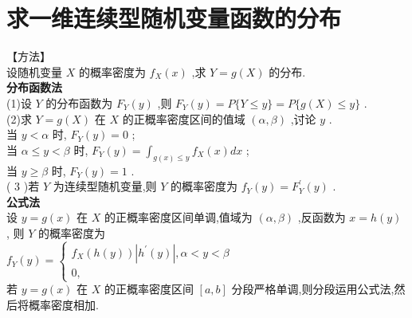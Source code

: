 \documentclass[12pt, a4paper, oneside, UTF8]{ctexbook}
\begin{document}
\section{求一维连续型随机变量函数的分布}
\begin{remark}
【方法】
\\设随机变量 \( X \) 的概率密度为 \( {f}_{X}\left( x\right) \) ,求 \( Y = g\left( X\right) \) 的分布. \\ 
\textbf{分布函数法} \\
(1)设 \( Y \) 的分布函数为 \( {F}_{Y}\left( y\right) \) ,则 \( {F}_{Y}\left( y\right)  = P\{ Y \leq  y\}  = P\{ g\left( X\right)  \leq  y\} \) . \\
(2)求 \( Y = g\left( X\right) \) 在 \( X \) 的正概率密度区间的值域 \( \left( {\alpha ,\beta }\right) \) ,讨论 \( y \) . \\
当 \( y < \alpha \) 时, \( {F}_{Y}\left( y\right)  = 0 \) ; \\
当 \( \alpha  \leq  y < \beta \) 时, \( {F}_{Y}\left( y\right)  = {\int }_{g\left( x\right)  \leq  y}{f}_{X}\left( x\right) {dx} \) ;\\
当 \( y \geq  \beta \) 时, \( {F}_{Y}\left( y\right)  = 1 \) . \\
( 3 )若 \( Y \) 为连续型随机变量,则 \( Y \) 的概率密度为 \( {f}_{Y}\left( y\right)  = {F}_{Y}^{\prime }\left( y\right) \) . \\
\textbf{公式法}\\
设 \( y = g\left( x\right) \) 在 \( X \) 的正概率密度区间单调,值域为 \( \left( {\alpha ,\beta }\right) \) ,反函数为 \( x = h\left( y\right) \) ,
则 \( Y \) 的概率密度为 \\
\( {f}_{Y}\left( y\right)  = \left\{  \begin{matrix} {f}_{X}\left( {h\left( y\right) }\right) \left| {{h}^{\prime }\left( y\right) }\right| ,\alpha  < y < \beta \\  0, \end{matrix}\right. \) \\
若 \( y = g\left( x\right) \) 在 \( X \) 的正概率密度区间 \( \left\lbrack  {a,b}\right\rbrack \) 分段严格单调,则分段运用公式法,然后将概率密度相加.
\end{remark}
\end{document}
